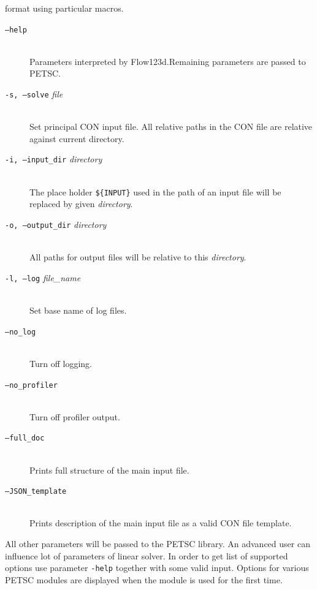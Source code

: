 \documentclass[12pt,a4paper]{report}
\begin{document}
                          format using particular macros.


\begin{description}
 \item[{\tt --help}] \hfill\\
        Parameters interpreted by Flow123d.Remaining parameters are passed to PETSC.
 \item[{\tt -s, --solve} {\it file}] \hfill\\
 	 Set principal CON input file. All relative paths in the CON file are relative against current directory.
 \item[{\tt -i, --input\_dir} {\it directory}] \hfill\\
 	The place holder \verb"${INPUT}" %
  	used in the path of an input file will be replaced by given {\it directory}.
 \item[{\tt -o, --output\_dir} {\it directory}] \hfill\\
 	All paths for output files will be relative to this {\it directory}. 
 \item[{\tt -l, --log} {\it file\_name}] \hfill\\
 	Set base name of log files.
 \item[{\tt --no\_log}] \hfill\\
        Turn off logging.
 \item[{\tt --no\_profiler}] \hfill\\
        Turn off profiler output.
 \item[{\tt --full\_doc}] \hfill\\
        Prints full structure of the main input file.
 \item[{\tt --JSON\_template}] \hfill\\
        Prints description of the main input file as a valid CON file template.
\end{description}
All other parameters will be passed to the PETSC library. An advanced user can influence lot of parameters of linear solver. In order to get list of supported options 
use parameter \verb'-help' together with some valid input. Options for various PETSC modules are displayed when the module is used for the first time.
\end{document}
